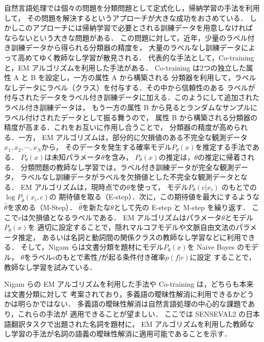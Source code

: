 自然言語処理では個々の問題を分類問題として定式化し，帰納学習の手法を利用して，
その問題を解決するというアプローチが大きな成功をおさめている．
しかしこのアプローチには帰納学習で必要とされる訓練データを用意しなければ
ならないという大きな問題がある．
この問題に対して，近年，少量のラベル付き訓練データから得られる分類器の精度を，
大量のラベルなし訓練データによって高めてゆく教師なし学習が散見される．
代表的な手法として，Co-training\cite{blum98} と，EM アルゴリズムを利用した手法\cite{nigam00}がある．
Co-training は2つの独立した属性 A と B を設定し，一方の属性 A から構築される
分類器を利用して，ラベルなしデータにラベル（クラス）を付与する．その中から信頼性のある
ラベルが付与されたデータをラベル付き訓練データに加える．このようにして追加されたラベル付き訓練データは，
もう一方の属性 B から見るとランダムなサンプルにラベル付けされたデータとして振る舞うので，
属性 B から構築される分類器の精度が高まる．これをお互いに作用し合うことで，
分類器の精度が高められる．一方，
EM アルゴリズムは，部分的に欠損値のある不完全な観測データ\( x_1, x_2, \cdots, x_N \)から，
そのデータを発生する確率モデル\( P_{\theta}(x) \)を推定する手法である．
\( P_{\theta}(x) \)は未知パラメータ\( \theta \)を含み，
\( P_{\theta}(x) \)の推定は，\( \theta \)の推定に帰着される．
分類問題の教師なし学習では，ラベル付き訓練データが完全な観測データ，
ラベルなし訓練データがラベルを欠損値とした不完全な観測データとなる．
EM アルゴリズムは，現時点での\( \theta \)を使って，
モデル\( P_{\theta}(c|x_i) \) のもとでの\( \log P_{\hat{\theta}}(x_i,c) \)の
期待値を取る（E-step）．次に，この期待値を最大にするような\( \hat{\theta} \)を求める（M-Step）．
\( \hat{\theta} \)を新たな\( \theta\)として先の E-step と M-step を繰り返す．
ここで\( c \)は欠損値となるラベルである．
EM アルゴリズムはパラメータ\( \theta \)とモデル\( P_\theta (x) \)を
適切に設定することで，隠れマルコフモデルや文脈自由文法のパラメータ推定，
あるいは名詞と動詞間の関係クラスの教師なし学習\cite{rooth}\cite{torisawa}などに利用できる．
そして，Nigam らは文書分類を題材にモデル\( P_\theta (x) \)を Naive Bayes のモデル，
\( \theta \)をラベル\( c \)のもとで素性\( f \)が起る条件付き確率\( p(f | c) \)に設定
することで，教師なし学習を試みている\cite{nigam00}．

Nigam らの EM アルゴリズムを利用した手法や Co-training は，どちらも本来は文書分類に対して
考案されており，多義語の曖昧性解消に利用できるかどうかは明らかではない．
多義語の曖昧性解消は自然言語処理の中心的な課題であり，これらの手法が
適用できることが望ましい．
ここでは SENSEVAL2 の日本語翻訳タスクで出題された名詞を題材に，
EM アルゴリズムを利用した教師なし学習の手法が名詞の語義の曖昧性解消に適用可能であることを示す．

